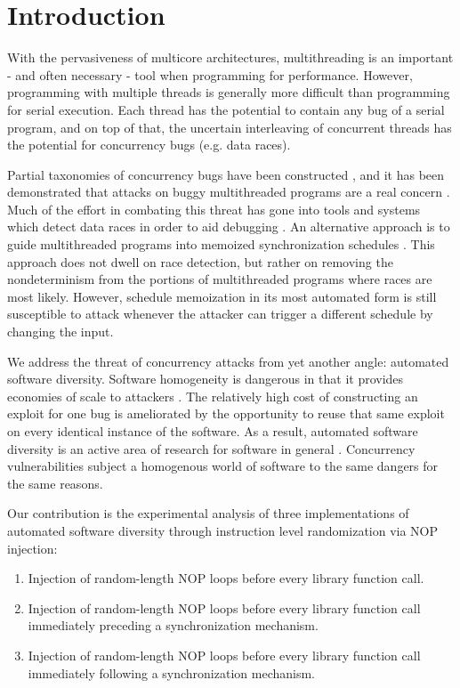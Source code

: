 \documentclass[letterpaper,twocolumn,10pt]{article}
\begin{document}
\section{Introduction}
With the pervasiveness of multicore architectures, multithreading is an important - and often necessary - tool when programming for performance.
However, programming with multiple threads is generally more difficult than programming for serial execution.
Each thread has the potential to contain any bug of a serial program, and on top of that, the uncertain interleaving of concurrent threads has the potential for concurrency bugs (e.g. data races).

Partial taxonomies of concurrency bugs have been constructed \cite{Farchi2003, Lu2008}, and it has been demonstrated that attacks on buggy multithreaded programs are a real concern \cite{Yang2012}.
Much of the effort in combating this threat has gone into tools and systems which detect data races in order to aid debugging \cite{Savage1997, Flanagan2004, Laadan2011, Pratikakis2011, Kasikci2013}.
An alternative approach is to guide multithreaded programs into memoized synchronization schedules \cite{Cui2010}.
This approach does not dwell on race detection, but rather on removing the nondeterminism from the portions of multithreaded programs where races are most likely.
However, schedule memoization in its most automated form is still susceptible to attack whenever the attacker can trigger a different schedule by changing the input.

We address the threat of concurrency attacks from yet another angle: automated software diversity.
Software homogeneity is dangerous in that it provides economies of scale to attackers \cite{Geer2003b}.
The relatively high cost of constructing an exploit for one bug is ameliorated by the opportunity to reuse that same exploit on every identical instance of the software.
As a result, automated software diversity is an active area of research for software in general \cite{Larsen2014}.
Concurrency vulnerabilities subject a homogenous world of software to the same dangers for the same reasons.

Our contribution is the experimental analysis of three implementations of automated software diversity through instruction level randomization via NOP injection:
\begin{enumerate}
	\item Injection of random-length NOP loops before every library function call.
	\item Injection of random-length NOP loops before every library function call immediately preceding a synchronization mechanism.
	\item Injection of random-length NOP loops before every library function call immediately following a synchronization mechanism.
\end{enumerate}
\end{document}

